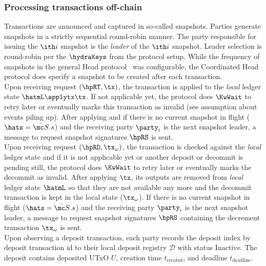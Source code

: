 \subsubsection{Processing transactions off-chain}

Transactions are announced and captured in so-called snapshots. Parties generate
snapshots in a strictly sequential round-robin manner. The party responsible for
issuing the $\ith i$ snapshot is the \emph{leader} of the $\ith i$ snapshot.
Leader selection is round-robin per the $\hydraKeys$ from the protocol setup.
While the frequency of snapshots in the general Head protocol~\cite{hydrahead20}
was configurable, the Coordinated Head protocol does specify a snapshot to be
created after each transaction.\\

\quad Upon receiving request $(\hpRT,\tx)$, the transaction
is applied to the \emph{local} ledger state $\hatmL \applytx \tx$. If not
applicable yet, the protocol does $\KwWait$ to retry later or eventually marks
this transaction as invalid (see assumption about events piling up). After
applying and if there is no current snapshot in flight ($\hats = \bar{\mc S}.s$)
and the receiving party $\party_{i}$ is the next snapshot leader, a message to
request snapshot signatures $\hpRS$ is sent. \\

\quad Upon receiving request $(\hpRD,\tx_\omega)$, the
transaction is checked against the \emph{local} ledger state and if it is not
applicable yet or another deposit or decommit is pending still, the protocol does
$\KwWait$ to retry later or eventually marks the decommit as invalid. After
applying $\tx$, its outputs are removed from \emph{local} ledger state $\hatmL$
so that they are not available any more and the decommit transaction is kept in
the local state ($\tx_\omega$). If there is no current snapshot in flight
($\hats = \bar{\mc S}.s$) and the receiving party $\party_{i}$ is the next
snapshot leader, a message to request snapshot signatures $\hpRS$ containing the
decrement transaction $\tx_\omega$ is sent. \\

\quad Upon observing a deposit transaction,
each party records the deposit index by deposit transaction id to their local
deposit registry $\mathcal{D}$ with status $\text{Inactive}$. The deposit
contains deposited UTxO $U$, creation time $t_{\text{created}}$, and deadline
$t_{\text{deadline}}$. \\

